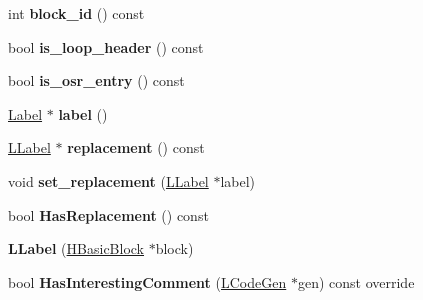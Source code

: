 \begin{DoxyCompactItemize}
\item 
int {\bfseries block\+\_\+id} () const \hypertarget{classv8_1_1internal_1_1_l_label_a87739f07ada487049bd402d117ea0bdc}{}\label{classv8_1_1internal_1_1_l_label_a87739f07ada487049bd402d117ea0bdc}

\item 
bool {\bfseries is\+\_\+loop\+\_\+header} () const \hypertarget{classv8_1_1internal_1_1_l_label_a310f97c551f5ab43f42ef04d2b97b349}{}\label{classv8_1_1internal_1_1_l_label_a310f97c551f5ab43f42ef04d2b97b349}

\item 
bool {\bfseries is\+\_\+osr\+\_\+entry} () const \hypertarget{classv8_1_1internal_1_1_l_label_a2a98f2b24dada94a6a1e4f78b0cb88be}{}\label{classv8_1_1internal_1_1_l_label_a2a98f2b24dada94a6a1e4f78b0cb88be}

\item 
\hyperlink{classv8_1_1internal_1_1_label}{Label} $\ast$ {\bfseries label} ()\hypertarget{classv8_1_1internal_1_1_l_label_aad0d2d6e266d7d6ee11d0d4d2e4342c8}{}\label{classv8_1_1internal_1_1_l_label_aad0d2d6e266d7d6ee11d0d4d2e4342c8}

\item 
\hyperlink{classv8_1_1internal_1_1_l_label}{L\+Label} $\ast$ {\bfseries replacement} () const \hypertarget{classv8_1_1internal_1_1_l_label_aeae2ce751911693b33505ace069c9f38}{}\label{classv8_1_1internal_1_1_l_label_aeae2ce751911693b33505ace069c9f38}

\item 
void {\bfseries set\+\_\+replacement} (\hyperlink{classv8_1_1internal_1_1_l_label}{L\+Label} $\ast$label)\hypertarget{classv8_1_1internal_1_1_l_label_a05875ed6601582974b107974f2720dc6}{}\label{classv8_1_1internal_1_1_l_label_a05875ed6601582974b107974f2720dc6}

\item 
bool {\bfseries Has\+Replacement} () const \hypertarget{classv8_1_1internal_1_1_l_label_a3215ec5382dd576d965f7ff0e18a7b0e}{}\label{classv8_1_1internal_1_1_l_label_a3215ec5382dd576d965f7ff0e18a7b0e}

\item 
{\bfseries L\+Label} (\hyperlink{classv8_1_1internal_1_1_h_basic_block}{H\+Basic\+Block} $\ast$block)\hypertarget{classv8_1_1internal_1_1_l_label_aa8ea13a89f3934f66742778ba3f83cd4}{}\label{classv8_1_1internal_1_1_l_label_aa8ea13a89f3934f66742778ba3f83cd4}

\item 
bool {\bfseries Has\+Interesting\+Comment} (\hyperlink{classv8_1_1internal_1_1_l_code_gen}{L\+Code\+Gen} $\ast$gen) const  override\hypertarget{classv8_1_1internal_1_1_l_label_aa0a8236af4aaa8c0433e5082df86d31a}{}\label{classv8_1_1internal_1_1_l_label_aa0a8236af4aaa8c0433e5082df86d31a}


\end{DoxyCompactItemize}
